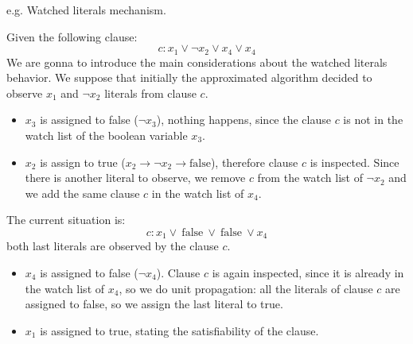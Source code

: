 \begin{example}
    e.g. Watched literals mechanism. \vspace{7pt}

    Given the following clause:
    $$ c: x_1 \vee \neg x_2 \vee x_4 \vee x_4 $$
    We are gonna to introduce the main considerations about the watched literals behavior. We suppose that initially the approximated algorithm decided to 
    observe $x_1$ and $\neg x_2$ literals from clause $c$. \vspace{7pt}

    \begin{itemize}
        \renewcommand{\labelitemi}{-} 
        \item $x_3$ is assigned to false ($\neg x_3$), nothing happens, since the clause $c$ is not in the watch list of the boolean variable $x_3$.
        \item $x_2$ is assign to true ($x_2 \rightarrow \neg x_2 \rightarrow \text{false}$), therefore clause $c$ is inspected. Since there is another literal to observe, we remove $c$ from the watch list of $\neg x_2$ and we add the same clause $c$ in the watch list of $x_4$.
    \end{itemize} \vspace{7pt}

    The current situation is:
    $$ c: x_1 \vee \ \text{false} \ \vee \ \text{false} \ \vee x_4 $$
    both last literals are observed by the clause $c$. \vspace{7pt}

    \begin{itemize}
        \renewcommand{\labelitemi}{-} 
        \item $x_4$ is assigned to false ($\neg x_4$). Clause $c$ is again inspected, since it is already in the watch list of $x_4$, so we do unit propagation: all the literals of clause $c$ are assigned to false, so we assign the last literal to true.
        \item $x_1$ is assigned to true, stating the satisfiability of the clause.
    \end{itemize}
\end{example}